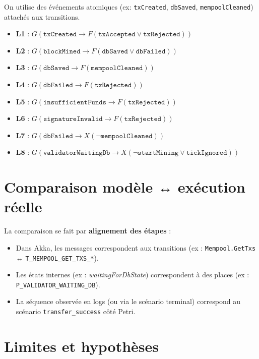 \documentclass[11pt,a4paper]{article}
\begin{document}
On utilise des événements atomiques (ex: \texttt{txCreated}, \texttt{dbSaved}, \texttt{mempoolCleaned}) attachés aux transitions.

\begin{itemize}[leftmargin=*]
  \item \textbf{L1} : $G(\texttt{txCreated} \to F(\texttt{txAccepted} \lor \texttt{txRejected}))$
  \item \textbf{L2} : $G(\texttt{blockMined} \to F(\texttt{dbSaved} \lor \texttt{dbFailed}))$
  \item \textbf{L3} : $G(\texttt{dbSaved} \to F(\texttt{mempoolCleaned}))$
  \item \textbf{L4} : $G(\texttt{dbFailed} \to F(\texttt{txRejected}))$
  \item \textbf{L5} : $G(\texttt{insufficientFunds} \to F(\texttt{txRejected}))$
  \item \textbf{L6} : $G(\texttt{signatureInvalid} \to F(\texttt{txRejected}))$
  \item \textbf{L7} : $G(\texttt{dbFailed} \to X(\lnot\texttt{mempoolCleaned}))$
  \item \textbf{L8} : $G(\texttt{validatorWaitingDb} \to X(\lnot\texttt{startMining} \lor \texttt{tickIgnored}))$
\end{itemize}

\section{Comparaison modèle ↔ exécution réelle}\label{sec:compare}

La comparaison se fait par \textbf{alignement des étapes} :
\begin{itemize}[leftmargin=*]
  \item Dans Akka, les messages correspondent aux transitions (ex : \texttt{Mempool.GetTxs} ↔ \texttt{T\_MEMPOOL\_GET\_TXS\_*}).
  \item Les états internes (ex : \emph{waitingForDbState}) correspondent à des places (ex : \texttt{P\_VALIDATOR\_WAITING\_DB}).
  \item La séquence observée en logs (ou via le scénario terminal) correspond au scénario \texttt{transfer\_success} côté Petri.
\end{itemize}

\section{Limites et hypothèses}\label{sec:limits}
\end{document}
